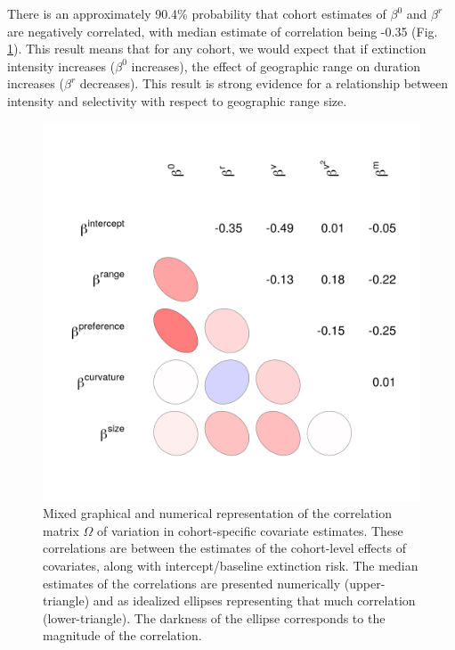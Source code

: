 \documentclass[11pt]{article}
\begin{document}
There is an approximately 90.4\% probability that cohort estimates of \(\beta^{0}\) and \(\beta^{r}\) are negatively correlated, with median estimate of correlation being -0.35 (Fig. \ref{fig:cor_posterior}). This result means that for any cohort, we would expect that if extinction intensity increases (\(\beta^{0}\) increases), the effect of geographic range on duration increases (\(\beta^{r}\) decreases). This result is strong evidence for a relationship between intensity and selectivity with respect to geographic range size.

\begin{figure}[ht]
  \centering
  \includegraphics[height = 0.7\textheight,width=\textwidth,keepaspectratio=true]{figure/wei_cor_heatmap_cweib_cens}
  \caption{Mixed graphical and numerical representation of the correlation matrix \(\Omega\) of variation in cohort-specific covariate estimates. These correlations are between the estimates of the cohort-level effects of covariates, along with intercept/baseline extinction risk. The median estimates of the correlations are presented numerically (upper-triangle) and as idealized ellipses representing that much correlation (lower-triangle). The darkness of the ellipse corresponds to the magnitude of the correlation.}
  \label{fig:cor_posterior}
\end{figure}
\end{document}
